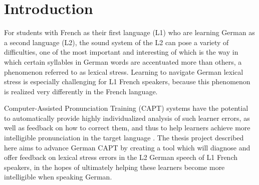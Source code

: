 %

%
\chapter{Introduction}
\label{chap:intro}




For students with French as their first language (L1) who are learning German as a second language (L2), the sound system of the L2 can pose a variety of difficulties, one of the most important and interesting of which is the way in which certain syllables in German words are accentuated more than others, a phenomenon referred to as lexical stress. Learning to navigate German lexical stress is especially challenging for L1 French speakers, because this phenomenon is realized very differently in the French language. 

Computer-Assisted Pronunciation Training (CAPT) systems
have the potential to automatically provide highly individualized analysis of such learner errors, as well as feedback on how to correct them, and thus to help learners achieve more intelligible 
pronunciation in the target language \citep{Witt2012}. 
%
The thesis project described here aims to advance 
German CAPT %
by creating a tool which will diagnose and offer feedback on lexical stress errors in the L2 German speech of L1 French speakers, in the hopes of ultimately helping these learners 
become more intelligible when speaking German.



